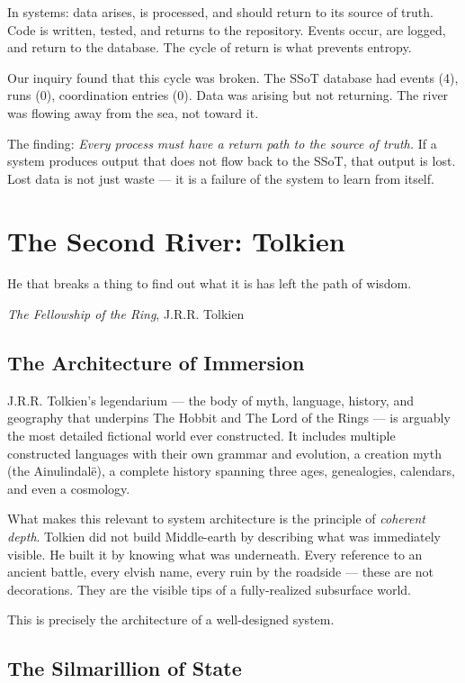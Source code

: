 \documentclass[12pt,a4paper,oneside]{book}
\begin{document}
In systems: data arises, is processed, and should return to its source of truth. Code is written, tested, and returns to the repository. Events occur, are logged, and return to the database. The cycle of return is what prevents entropy.

Our inquiry found that this cycle was broken. The SSoT database had events (4), runs (0), coordination entries (0). Data was arising but not returning. The river was flowing away from the sea, not toward it.

The finding: \emph{Every process must have a return path to the source of truth.} If a system produces output that does not flow back to the SSoT, that output is lost. Lost data is not just waste --- it is a failure of the system to learn from itself.

\chapter{The Second River: Tolkien}

\epigraph{He that breaks a thing to find out what it is has left the path of wisdom.}{\textit{The Fellowship of the Ring}, J.R.R. Tolkien}

\section{The Architecture of Immersion}

J.R.R. Tolkien's legendarium --- the body of myth, language, history, and geography that underpins The Hobbit and The Lord of the Rings --- is arguably the most detailed fictional world ever constructed. It includes multiple constructed languages with their own grammar and evolution, a creation myth (the Ainulindal\"e), a complete history spanning three ages, genealogies, calendars, and even a cosmology.

What makes this relevant to system architecture is the principle of \emph{coherent depth}. Tolkien did not build Middle-earth by describing what was immediately visible. He built it by knowing what was underneath. Every reference to an ancient battle, every elvish name, every ruin by the roadside --- these are not decorations. They are the visible tips of a fully-realized subsurface world.

This is precisely the architecture of a well-designed system.

\section{The Silmarillion of State}
\end{document}
